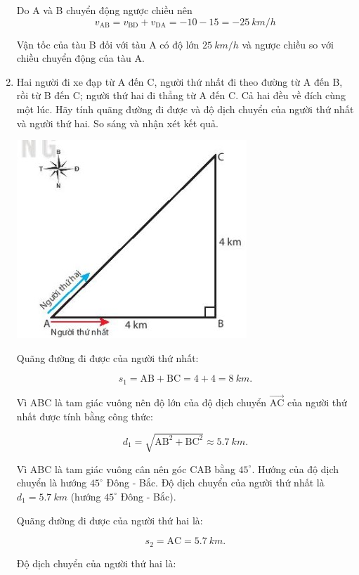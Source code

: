 \begin{enumerate}[label=\bfseries Câu \arabic*:]
{			Do A và B chuyển động ngược chiều nên
			$$v_\text{AB} = v_\text{BD} + v_\text{DA} = -10-15 = \SI{-25}{km/h}$$
			
			Vận tốc của tàu B đối với tàu A có độ lớn $\SI{25}{km/h}$ và ngược chiều so với chiều chuyển động của tàu A.
		}
		\item {}
	
	\cauhoi
	{
		Hai người đi xe đạp từ A đến C, người thứ nhất đi theo đường từ A đến B, rồi từ B đến C; người thứ hai đi thẳng từ A đến C. Cả hai đều về đích cùng một lúc. Hãy tính quãng đường đi được và độ dịch chuyển của người thứ nhất và người thứ hai. So sáng và nhận xét kết quả.
		
		\begin{center}
			\includegraphics[scale=1]{../figs/VN10-2022-PH-TP004-5.jpg}
		\end{center}
	}
	
	\loigiai
	{	
		
		Quãng đường đi được của người thứ nhất:
		
		$$s_1 = \text{AB} + \text{BC} = 4+4 = \SI{8}{km}.$$
		
		Vì ABC là tam giác vuông nên độ lớn của độ dịch chuyển $\vec{\text{AC}}$ của người thứ nhất được tính bằng công thức:
		
		$$d_1 = \sqrt{\text{AB}^2 + \text{BC}^2} \approx \SI{5,7}{km}.$$
		
		Vì ABC là tam giác vuông cân nên góc CAB bằng $45^\circ$. Hướng của độ dịch chuyển là hướng $45^\circ$ Đông - Bắc. Độ dịch chuyển của người thứ nhất là $d_1 = \SI{5,7}{km}$ (hướng $45^\circ$ Đông - Bắc).
		
		Quãng đường đi được của người thứ hai là:
		
		$$s_2 = \text{AC} = \SI{5,7}{km}.$$
		
		Độ dịch chuyển của người thứ hai là:
		
}
\end{enumerate}
